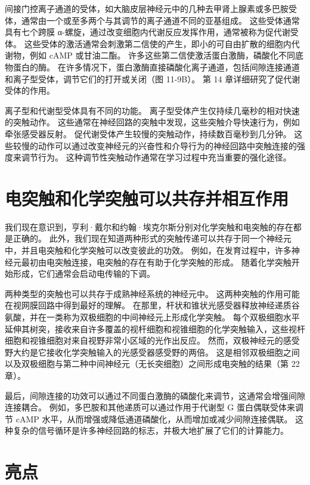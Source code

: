 间接门控离子通道的受体，如大脑皮层神经元中的几种去甲肾上腺素或多巴胺受体，通常由一个或至多两个与其调节的离子通道不同的亚基组成。 这些受体通常具有七个跨膜 α-螺旋，通过改变细胞内代谢反应发挥作用，通常被称为促代谢受体。 这些受体的激活通常会刺激第二信使的产生，即小的可自由扩散的细胞内代谢物，例如 cAMP 或甘油二酯。 许多这些第二信使激活蛋白激酶，磷酸化不同底物蛋白的酶。 在许多情况下，蛋白激酶直接磷酸化离子通道，包括间隙连接通道和离子型受体，调节它们的打开或关闭（图 11-9B）。 第 14 章详细研究了促代谢受体的作用。

离子型和代谢型受体具有不同的功能。 离子型受体产生仅持续几毫秒的相对快速的突触动作。 这些通常在神经回路的突触中发现，这些突触介导快速行为，例如牵张感受器反射。 促代谢受体产生较慢的突触动作，持续数百毫秒到几分钟。 这些较慢的动作可以通过改变神经元的兴奋性和介导行为的神经回路中突触连接的强度来调节行为。 这种调节性突触动作通常在学习过程中充当重要的强化途径。



\section{电突触和化学突触可以共存并相互作用}

我们现在意识到，亨利·戴尔和约翰·埃克尔斯分别对化学突触和电突触的存在都是正确的。 此外，我们现在知道两种形式的突触传递可以共存于同一个神经元中，并且电突触和化学突触可以改变彼此的功效。 例如，在发育过程中，许多神经元最初由电突触连接，电突触的存在有助于化学突触的形成。 随着化学突触开始形成，它们通常会启动电传输的下调。

两种类型的突触也可以共存于成熟神经系统的神经元中。 这两种突触的作用可能在视网膜回路中得到最好的理解。 在那里，杆状和锥状光感受器释放神经递质谷氨酸，并在一类称为双极细胞的中间神经元上形成化学突触。 每个双极细胞水平延伸其树突，接收来自许多覆盖的视杆细胞和视锥细胞的化学突触输入，这些视杆细胞和视锥细胞对来自视野非常小区域的光作出反应。 然而，双极神经元的感受野大约是它接收化学突触输入的光感受器感受野的两倍。 这是相邻双极细胞之间以及双极细胞与第二种中间神经元（无长突细胞）之间形成电突触的结果（第 22 章）。

最后，间隙连接的功效可以通过不同蛋白激酶的磷酸化来调节，这通常会增强间隙连接耦合。 例如，多巴胺和其他递质可以通过作用于代谢型 G 蛋白偶联受体来调节 cAMP 水平，从而增强或降低通道磷酸化，从而增加或减少间隙连接偶联。 这种复杂的信号循环是许多神经回路的标志，并极大地扩展了它们的计算能力。

\section{亮点}

